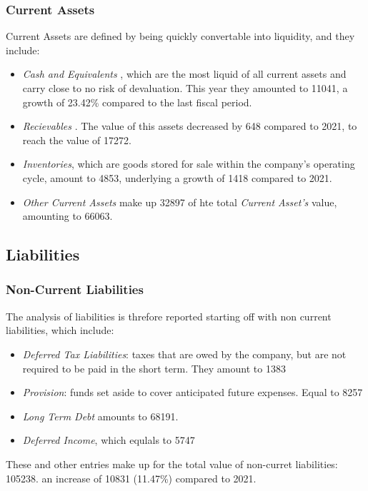 \documentclass{article}
\begin{document}
\subsubsection{Current Assets}
Current Assets are defined by being quickly convertable into liquidity, and they include:
\begin{itemize}
  \item \textit{ Cash and Equivalents }, which are the most liquid of all current assets and carry close to no risk of devaluation. This year they amounted to 11041, a growth of 23.42\% compared to the last fiscal period.
  \item \textit{ Recievables }. The value of this assets decreased by 648 compared to 2021, to reach the value of 17272.
  \item \textit{Inventories}, which are goods stored for sale within the company's operating cycle, amount to 4853, underlying a growth of 1418 compared to 2021.
  \item \textit{Other Current Assets} make up 32897 of hte total \textit{Current Asset's} value, amounting to 66063.

\end{itemize}
\subsection{Liabilities}
\subsubsection{Non-Current Liabilities}
The analysis of liabilities is threfore reported starting off with non current liabilities, which include:
\begin{itemize}
  \item \textit{Deferred Tax Liabilities}: taxes that are owed by the company, but are not required to be paid in the short term. They amount to 1383
  \item \textit{Provision}: funds set aside to cover anticipated future expenses. Equal to 8257
  \item \textit{Long Term Debt} amounts to 68191.
  \item \textit{Deferred Income}, which equlals to 5747
\end{itemize}
These and other entries make up for the total value of non-curret liabilities: 105238. an increase of 10831 (11.47\%) compared to 2021.
\end{document}
